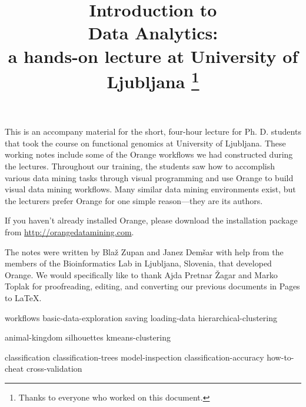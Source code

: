 \documentclass[symmetric, justified, a4paper, nofonts]{tufte-book}
\title{Introduction to \\ Data Analytics: \\ {\large a hands-on lecture at University of Ljubljana}
\thanks{Thanks to everyone who worked on this document.}}
\author{}
\begin{document}
\frontmatter

\maketitle

This is an accompany material for the short, four-hour lecture for Ph. D. students that took the course on functional genomics at University of Ljubljana. These working notes include some of the Orange workflows we had constructed during the lectures. Throughout our training, the students saw how to accomplish various data mining tasks through visual programming and use Orange to build visual data mining workflows. Many similar data mining environments exist, but the lecturers prefer Orange for one simple reason—they are its authors.

If you haven't already installed Orange, please download the installation package from \url{http://orangedatamining.com}.

The notes were written by Blaž Zupan and Janez Demšar with help from the members of the Bioinformatics Lab in Ljubljana, Slovenia, that developed Orange. We would specifically like to thank Ajda Pretnar Žagar and Marko Toplak for proofreading, editing, and converting our previous documents in Pages to LaTeX.



\tableofcontents

\mainmatter

{workflows}
{basic-data-exploration}
{saving}
{loading-data}
{hierarchical-clustering}

{animal-kingdom}
{silhouettes}
{kmeans-clustering}

{classification}
{classification-trees}
{model-inspection}
{classification-accuracy}
{how-to-cheat}
{cross-validation}
\end{document}
